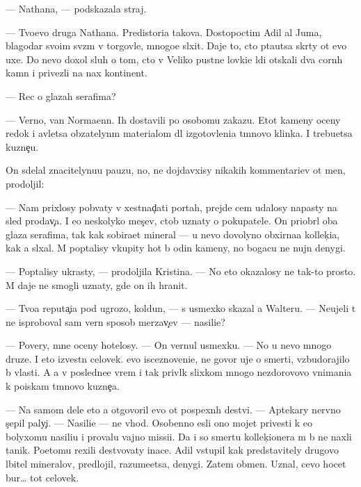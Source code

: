 \documentclass[10pt]{book}
\begin{document}
— Nathana, — podskazala straj.

— Tvo{\y}evo druga Nathana. Predistori{\y}a takova. Dostopoctim{\yi}{\y} Adil al Juma, blagodar{\ia} svo{\y}im sv{\ia}z{\ia}m v torgovle, mnogo{\y}e sl{\yi}xit. Daje to, cto p{\yi}ta{\y}utsa skr{\yi}\-ty ot {\y}evo uxe{\y}. Do nevo doxol sluh o tom, cto v Veliko{\y} pust{\yi}ne lovki{\y}e l{\io}di ot{\yi}skali dva corn{\yi}h kamn{\ia} i privezli na nax kontinent.

— Rec o glazah serafima?

— Verno, van Normaenn. Ih dostavili po osobomu zakazu. Etot kameny oceny redok i {\y}avl{\ia}{\y}etsa ob{\ia}zatelyn{\yi}m materialom dl{\ia} izgotovleni{\y}a t{\e}mnovo klinka. I trebu{\y}etsa kuzne{\c}u.

On sdelal znacitelynu{\y}u pauzu, no, ne dojdavxisy nikakih kommentari{\y}ev ot men{\ia}, prodoljil:

— Nam pri\-xlosy pob{\yi}vaty v xestnad{\c}ati portah, prejde cem udalosy napasty na sled prodav{\c}a. I {\y}e{\x}o neskolyko mes{\ia}{\c}ev, ctob{\yi} uznaty o pokupatele. On priobr{\e}l oba glaza serafima, tak kak sobira{\y}et mineral{\yi} — u nevo dovolyno obxirna{\y}a kollek{\c}i{\y}a, kak {\y}a sl{\yi}xal. M{\yi} pop{\yi}talisy v{\yi}kupity hot{\ia} b{\yi} odin kameny, no bogacu ne nujn{\yi} denygi.

— Pop{\yi}talisy ukrasty, — prodoljila Kristina. — No eto okazalosy ne tak-to prosto. M{\yi} daje ne smogli uznaty, gde on ih hranit.

— Tvo{\y}a reputa{\c}i{\y}a pod ugrozo{\y}, koldun, — s usmexko{\y} skazal {\y}a Walteru. — Neujeli t{\yi} ne isproboval sam{\yi}{\y} vern{\yi}{\y} sposob merzav{\c}ev — nasili{\y}e?

— Povery, mne oceny hotelosy. — On vernul usmexku. — No u nevo mnogo druze{\y}. I eto izvestn{\yi}{\y} celovek. {\Y}evo isceznoveni{\y}e, ne go\-vo\-r{\ia} uje o smerti, vzbudorajilo b{\yi} vlasti. A {\y}a v posledne{\y}e vrem{\ia} i tak privl{\e}k slixkom mnogo nezdorovovo vnimani{\y}a k poiskam t{\e}mnovo kuzne{\c}a.

— Na samom dele eto {\y}a otgovoril {\y}evo ot pospexn{\yi}h de{\y}stvi{\y}. — Aptekary nervno s{\c}epil paly{\c}i. — Nasili{\y}e — ne v{\yi}hod. Osobenno {\y}esli ono mojet privesti k {\y}e{\x}o bolyxomu nasili{\y}u i provalu vajno{\y} missi{\y}i. Da i so smert{\y}u kollek{\c}ionera m{\yi} b{\yi} ne naxli ta{\y}nik. Poetomu rexili de{\y}stvovaty inace. Adil v{\yi}stupil kak predstavitely drugovo l{\io}bitel{\ia} mineralov, predlojil, razume{\y}etsa, denygi. Zatem obmen. Uznal, cevo hocet bur… tot celovek.
\end{document}
